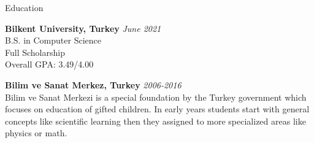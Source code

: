 \documentclass{resume} %
\begin{document}

\begin{rSection}{Education}

{\bf Bilkent University, Turkey} \hfill {\em June 2021} \\ 
B.S. in Computer Science \\
Full Scholarship \\
Overall GPA: 3.49/4.00

{\bf Bilim ve Sanat Merkez, Turkey} \hfill {\em 2006-2016} \\ 
Bilim ve Sanat Merkezi is a special foundation by the Turkey government which focuses on education of gifted children. In early years students start with general concepts like scientific learning then they assigned to more specialized areas like physics or math.

\end{rSection}

\end{document}

